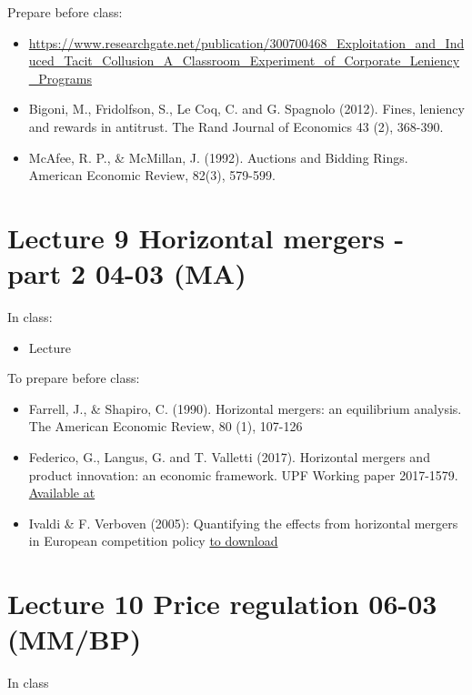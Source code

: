 \documentclass[]{book}
\providecommand{\tightlist}{%
  \setlength{\itemsep}{0pt}\setlength{\parskip}{0pt}}
\begin{document}
Prepare before class:

\begin{itemize}
\tightlist
\item
  \url{https://www.researchgate.net/publication/300700468_Exploitation_and_Induced_Tacit_Collusion_A_Classroom_Experiment_of_Corporate_Leniency_Programs}
\item
  Bigoni, M., Fridolfson, S., Le Coq, C. and G. Spagnolo (2012). Fines,
  leniency and rewards in antitrust. The Rand Journal of Economics 43
  (2), 368-390.
\item
  McAfee, R. P., \& McMillan, J. (1992). Auctions and Bidding Rings.
  American Economic Review, 82(3), 579-599.
\end{itemize}

\section{Lecture 9 Horizontal mergers - part 2 04-03
(MA)}\label{lecture-9-horizontal-mergers---part-2-04-03-ma}

In class:

\begin{itemize}
\tightlist
\item
  Lecture
\end{itemize}

To prepare before class:

\begin{itemize}
\tightlist
\item
  Farrell, J., \& Shapiro, C. (1990). Horizontal mergers: an equilibrium
  analysis. The American Economic Review, 80 (1), 107-126
\item
  Federico, G., Langus, G. and T. Valletti (2017). Horizontal mergers
  and product innovation: an economic framework. UPF Working paper
  2017-1579.
  \href{https://papers.ssrn.com/sol3/papers.cfm?abstract_id=2999178M}{Available
  at}
\item
  Ivaldi \& F. Verboven (2005): Quantifying the effects from horizontal
  mergers in European competition policy
  \href{https://ideas.repec.org/p/cpr/ceprdp/2697.html}{to download}
\end{itemize}

\section{Lecture 10 Price regulation 06-03
(MM/BP)}\label{lecture-10-price-regulation-06-03-mmbp}

In class
\end{document}
